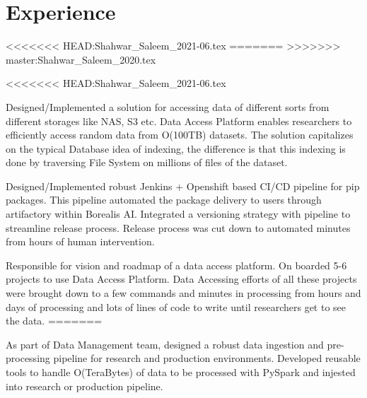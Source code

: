 \documentclass[]{deedy-resume-openfont}
\begin{document}
\begin{minipage}[t]{0.63\textwidth} 


\section{Experience}

<<<<<<< HEAD:Shahwar_Saleem_2021-06.tex
=======
>>>>>>> master:Shahwar_Saleem_2020.tex
\vspace{\topsep} %
\begin{tightemize}

<<<<<<< HEAD:Shahwar_Saleem_2021-06.tex
\item Designed/Implemented a solution for accessing data of different sorts from different storages like NAS, S3 etc. Data Access Platform enables researchers to efficiently access random data from O(100TB) datasets. The solution capitalizes on the typical Database idea of indexing, the difference is that this indexing is done by traversing File System on millions of files of the dataset.


\item Designed/Implemented robust Jenkins + Openshift based CI/CD pipeline for pip packages. This pipeline automated the package delivery to users through artifactory within Borealis AI. Integrated a versioning strategy with pipeline to streamline release process. Release process was cut down to automated minutes from hours of human intervention.

\item Responsible for vision and roadmap of a data access platform. On boarded 5-6 projects to use Data Access Platform. Data Accessing efforts of all these projects were brought down to a few commands and minutes in processing from hours and days of processing and lots of lines of code to write until researchers get to see the data.
=======
\item As part of Data Management team, designed a robust data ingestion and pre-processing pipeline for research and production environments. Developed reusable tools to handle O(TeraBytes) of data to be processed with PySpark and injested into research or production pipeline.


\end{tightemize}
\end{minipage}
\end{document}
